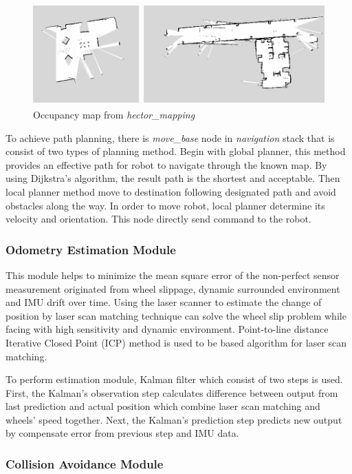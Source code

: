 \documentclass{llncs}
\begin{document}
\begin{figure}
\centering
\includegraphics[height=3.9cm]{hector_map}
\caption{Occupancy map from \textit{hector\_mapping}}
\label{fig:hector}
\end{figure}

To achieve path planning, there is \textit{move\_base} node in \textit{navigation} stack that is consist of two types of planning method. Begin with global planner, this method provides an effective path for robot to navigate through the known map. By using Dijkstra's algorithm, the result path is the shortest and acceptable. Then local planner method move to destination following designated path and avoid obstacles along the way. In order to move robot, local planner determine its velocity and orientation. This node directly send command to the robot.

\subsubsection{Odometry Estimation Module}

This module helps to minimize the mean square error of the non-perfect sensor measurement originated from wheel slippage, dynamic surrounded environment and IMU drift over time. Using the laser scanner to estimate the change of position by laser scan matching technique can solve the wheel slip problem while facing with high sensitivity and dynamic environment. Point-to-line distance Iterative Closed Point (ICP) method is used to be based algorithm for laser scan matching.

To perform estimation module, Kalman filter which consist of two steps is used. First, the Kalman's observation step calculates difference between output from last prediction and actual position which combine laser scan matching and wheels' speed together. Next, the Kalman's prediction step predicts new output by compensate error from previous step and IMU data\cite{odom}.

\subsubsection{Collision Avoidance Module}
\end{document}
